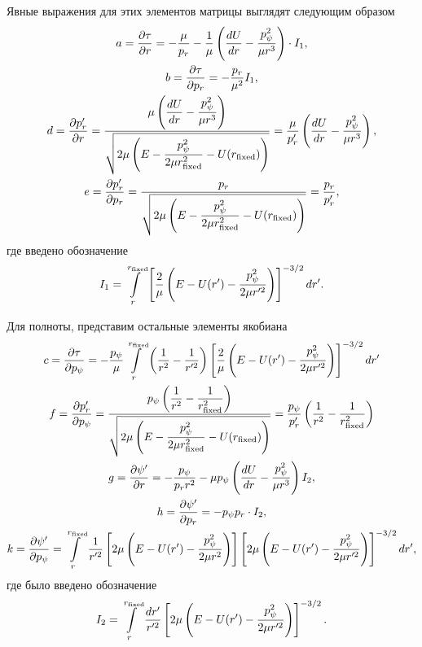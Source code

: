 Явные выражения для этих элементов матрицы выглядят следующим образом 
\begin{gather}
    a = \frac{\partial \tau}{\partial r} = -\frac{\mu}{p_r} - \frac{1}{\mu} \left( \frac{dU}{dr} - \frac{p_\psi^2}{\mu r^3} \right) \cdot I_1, \\ 
    b = \frac{\partial \tau}{\partial p_r} = - \frac{p_r}{\mu^2} I_1, \\ 
    d = \frac{\partial p_r^\prime}{\partial r} = \frac{\displaystyle \mu \left( \frac{dU}{dr} - \frac{p_\psi^2}{\mu r^3} \right)}{\displaystyle \sqrt{2\mu \left( E - \frac{p_\psi^2}{2 \mu r_\text{fixed}^2} - U(r_\text{fixed}) \right)}} = \frac{\mu}{p_r^\prime} \left( \frac{dU}{dr} - \frac{p_\psi^2}{\mu r^3} \right), \\
    e = \frac{\partial p_r^\prime}{\partial p_r} = \frac{p_r}{\displaystyle \sqrt{2\mu \left( E - \frac{p_\psi^2}{2 \mu r_\text{fixed}^2} - U(r_\text{fixed}) \right)}} = \frac{p_r}{p_r^\prime},
\end{gather}
%
где введено обозначение 
\begin{gather}
    I_1 = \int\limits_r^{r_\text{fixed}} \left[ \frac{2}{\mu} \left( E - U(r^\prime) - \frac{p_\psi^2}{2 \mu r^{\prime 2}} \right) \right]^{-3/2} dr^\prime. 
\end{gather}

Для полноты, представим остальные элементы якобиана
\begin{gather}
    c = \frac{\partial \tau}{\partial p_\psi} = -\frac{p_\psi}{\mu} \int\limits_r^{r_\text{fixed}} \left( \frac{1}{r^2} - \frac{1}{r^{\prime 2}} \right) \left[ \frac{2}{\mu} \left( E - U(r^\prime) - \frac{p_\psi^2}{2 \mu r^{\prime 2}} \right) \right]^{-3/2} dr^\prime \\
f = \frac{\partial p_r^\prime}{\partial p_\psi} = \frac{\displaystyle p_\psi \left( \frac{1}{r^2} - \frac{1}{r_\text{fixed}^2} \right)}{\displaystyle \sqrt{2 \mu \left( E - \frac{p_\psi^2}{2 \mu r_\text{fixed}^2} - U(r_\text{fixed}) \right)}} = \frac{p_\psi}{p_r^\prime} \left( \frac{1}{r^2} - \frac{1}{r_\text{fixed}^2} \right) \\
    g = \frac{\partial \psi^\prime}{\partial r} = -\frac{p_\psi}{p_r r^2} - \mu p_\psi \left( \frac{dU}{dr} - \frac{p_\psi^2}{\mu r^3} \right) I_2, \\ 
    h = \frac{\partial \psi^\prime}{\partial p_r} = -p_\psi p_r \cdot I_2, \\ 
    k = \frac{\partial \psi^\prime}{\partial p_\psi} = \int\limits_r^{r_\text{fixed}} \frac{1}{r^{\prime 2}} \left[ 2 \mu \left( E - U(r^\prime) - \frac{p_\psi^2}{2 \mu r^2} \right) \right] \left[ 2 \mu \left( E - U(r^\prime) - \frac{p_\psi^2}{2 \mu r^{\prime 2}} \right)\right]^{-3/2} dr^\prime,
\end{gather}
%
где было введено обозначение
\begin{gather}
    I_2 = \int\limits_r^{r_\text{fixed}} \frac{dr^\prime}{r^{\prime 2}} \left[ 2 \mu \left( E - U(r^\prime) - \frac{p_\psi^2}{2 \mu r^{\prime 2}} \right) \right]^{-3/2}.
\end{gather}

